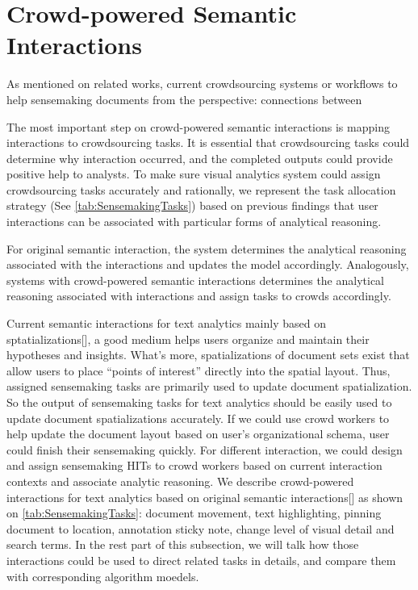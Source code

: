 \documentclass[journal]{vgtc}                %
\begin{document}
\section{Crowd-powered Semantic Interactions}

As mentioned on related works, current crowdsourcing systems or workflows to help sensemaking documents from the perspective: connections between


The most important step on crowd-powered semantic interactions is mapping interactions to crowdsourcing tasks. It is essential that crowdsourcing tasks could determine why interaction occurred, and the completed outputs could provide positive help to analysts. To make sure visual analytics system could assign crowdsourcing tasks accurately and rationally, we represent the task allocation strategy (See \autoref{tab:SensemakingTasks}) based on previous findings\cite{andrews2010space} that user interactions can be associated with particular forms of analytical reasoning.


For original semantic interaction, the system determines the analytical reasoning associated with the interactions and updates the model accordingly\cite{Endert2012V}. Analogously, systems with crowd-powered semantic interactions  determines the analytical reasoning associated with interactions and assign tasks to crowds accordingly.

Current semantic interactions for text analytics mainly based on sptatializations[], a good medium helps users organize and maintain their hypotheses and insights. What's more,   spatializations of document sets exist that allow users to place “points of interest” directly into the spatial layout. Thus, assigned sensemaking tasks are primarily used to update document spatialization. So the output of sensemaking tasks for text analytics should be easily used to update document spatializations accurately. If we could use crowd workers to help update the document layout based on user's organizational schema, user could finish their sensemaking quickly. For different interaction, we could design and assign sensemaking HITs to crowd workers based on current interaction contexts and associate analytic reasoning. We describe crowd-powered interactions for text analytics based on original semantic interactions[] as shown on \autoref{tab:SensemakingTasks}: document movement, text highlighting, pinning document to location, annotation sticky note, change level of visual detail and search terms. In the rest part of this subsection, we will talk how those interactions could be used to direct related tasks in details, and compare them with corresponding algorithm moedels.
\end{document}
